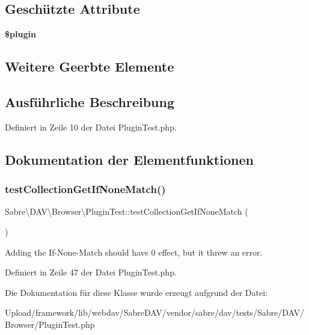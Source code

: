 \subsection*{Geschützte Attribute}
\begin{DoxyCompactItemize}
\item 
\mbox{\label{class_sabre_1_1_d_a_v_1_1_browser_1_1_plugin_test_ac5f249603c2c217a69a8caa96aaac064}} 
{\bfseries \$plugin}
\end{DoxyCompactItemize}
\subsection*{Weitere Geerbte Elemente}


\subsection{Ausführliche Beschreibung}


Definiert in Zeile 10 der Datei Plugin\+Test.\+php.



\subsection{Dokumentation der Elementfunktionen}
\mbox{\label{class_sabre_1_1_d_a_v_1_1_browser_1_1_plugin_test_af7472cb4058c4f434f015f2d562d9770}} 
\subsubsection{\texorpdfstring{test\+Collection\+Get\+If\+None\+Match()}{testCollectionGetIfNoneMatch()}}
{\footnotesize\ttfamily Sabre\textbackslash{}\+D\+A\+V\textbackslash{}\+Browser\textbackslash{}\+Plugin\+Test\+::test\+Collection\+Get\+If\+None\+Match (\begin{DoxyParamCaption}{ }\end{DoxyParamCaption})}

Adding the If-\/\+None-\/\+Match should have 0 effect, but it threw an error. 

Definiert in Zeile 47 der Datei Plugin\+Test.\+php.



Die Dokumentation für diese Klasse wurde erzeugt aufgrund der Datei\+:\begin{DoxyCompactItemize}
\item 
Upload/framework/lib/webdav/\+Sabre\+D\+A\+V/vendor/sabre/dav/tests/\+Sabre/\+D\+A\+V/\+Browser/Plugin\+Test.\+php\end{DoxyCompactItemize}
